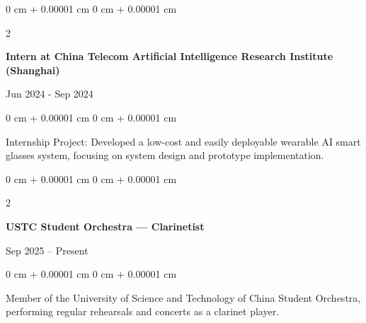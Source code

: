 \documentclass[10pt, letterpaper]{article}
\newenvironment{onecolentry}{
    \begin{adjustwidth}{
        0 cm + 0.00001 cm
    }{
        0 cm + 0.00001 cm
    }
}{
    \end{adjustwidth}
} %
\newenvironment{twocolentry}[2][]{
    \onecolentry
    \def\secondColumn{#2}
    \setcolumnwidth{\fill, 4.5 cm}
    \begin{paracol}{2}
}{
    \switchcolumn \raggedleft \secondColumn
    \end{paracol}
    \endonecolentry
} %
\begin{document}
        
         \begin{samepage}
          \begin{twocolentry}{
          Jun 2024 - Sep 2024
          }
                \textbf{Intern at China Telecom Artificial Intelligence Research Institute (Shanghai)}
                
\end{twocolentry}
            \vspace{0.10 cm}
            
            \begin{onecolentry}
      Internship Project: Developed a low-cost and easily deployable wearable AI smart glasses system, focusing on system design and prototype implementation.
        \end{onecolentry}
        \end{samepage}
                
            



                
            
    
\begin{samepage}
\begin{twocolentry}{
Sep 2025 – Present
}
\textbf{USTC Student Orchestra — Clarinetist}
\end{twocolentry}

\vspace{0.10 cm}

\begin{onecolentry}
Member of the University of Science and Technology of China Student Orchestra, performing regular rehearsals and concerts as a clarinet player.
\end{onecolentry}
\end{samepage}
    
\end{document}
